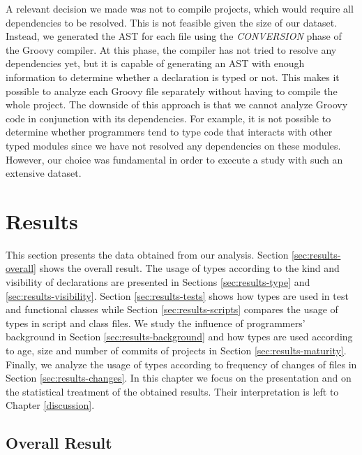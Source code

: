\documentclass[msc]{ppgccufmg}
\begin{document}
A relevant decision we made was not to compile projects, which would require all dependencies to be resolved.
This is not feasible given the size of our dataset.
Instead, we generated the AST for each file using the \emph{CONVERSION} phase of the Groovy compiler.
At this phase, the compiler has not tried to resolve any dependencies yet, but it is capable of generating an AST with enough information to determine whether a declaration is typed or not.
This makes it possible to analyze each Groovy file separately without having to compile the whole project.
The downside of this approach is that we cannot analyze Groovy code in conjunction with its dependencies. 
For example, it is not possible to determine whether programmers tend to type code that interacts with other typed modules since we have not resolved any dependencies on these modules.
However, our choice was fundamental in order to execute a study with such an extensive dataset.











%
%
\chapter{Results\label{results}}
This section presents the data obtained from our analysis.
Section \ref{sec:results-overall} shows the overall result.
The usage of types according to the kind and visibility of declarations are presented in Sections \ref{sec:results-type} and \ref{sec:results-visibility}.
Section \ref{sec:results-tests} shows how types are used in test and functional classes while Section \ref{sec:results-scripts} compares the usage of types in script and class files.
We study the influence of programmers' background in Section \ref{sec:results-background} and how types are used according to age, size and number of commits of projects in Section \ref{sec:results-maturity}.
Finally, we analyze the usage of types according to frequency of changes of files in Section \ref{sec:results-changes}.
In this chapter we focus on the presentation and on the statistical treatment of the obtained results.
Their interpretation is left to Chapter \ref{discussion}.

\section{Overall Result\label{sec:results-overall}}
\end{document}
